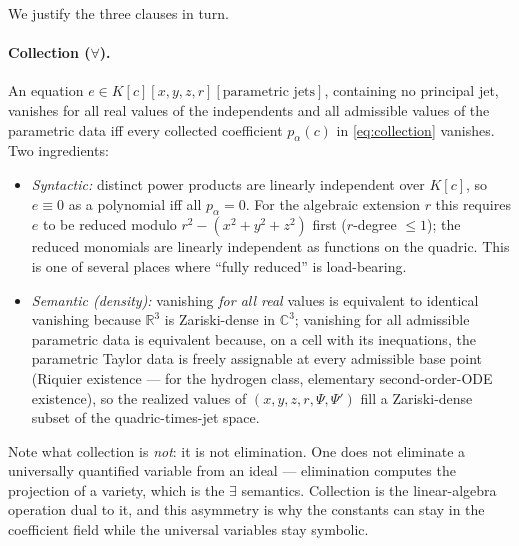 \documentclass[11pt]{article}
\newcommand{\Psib}{\Psi}
\begin{document}
We justify the three clauses in turn.

\paragraph{Collection ($\forall$).}
An equation $e \in K[c][x,y,z,r][\text{parametric jets}]$, containing no
principal jet, vanishes for all real values of the independents and all
admissible values of the parametric data iff every collected coefficient
$p_\alpha(c)$ in \eqref{eq:collection} vanishes. Two ingredients:
\begin{itemize}
\item \emph{Syntactic:} distinct power products are linearly independent over
  $K[c]$, so $e \equiv 0$ as a polynomial iff all $p_\alpha = 0$. For the
  algebraic extension $r$ this requires $e$ to be reduced modulo
  $r^2-(x^2+y^2+z^2)$ first ($r$-degree $\le 1$); the reduced monomials are
  linearly independent as functions on the quadric. This is one of several
  places where ``fully reduced'' is load-bearing.
\item \emph{Semantic (density):} vanishing \emph{for all real} values is
  equivalent to identical vanishing because $\mathbb{R}^3$ is Zariski-dense in
  $\mathbb{C}^3$; vanishing for all admissible parametric data is equivalent
  because, on a cell with its inequations, the parametric Taylor data is
  freely assignable at every admissible base point (Riquier existence --- for
  the hydrogen class, elementary second-order-ODE existence), so the realized
  values of $(x,y,z,r,\Psib,\Psib')$ fill a Zariski-dense subset of the
  quadric-times-jet space.
\end{itemize}
Note what collection is \emph{not}: it is not elimination. One does not
eliminate a universally quantified variable from an ideal --- elimination
computes the projection of a variety, which is the $\exists$ semantics.
Collection is the linear-algebra operation dual to it, and this asymmetry is
why the constants can stay in the coefficient field while the universal
variables stay symbolic.
\end{document}
